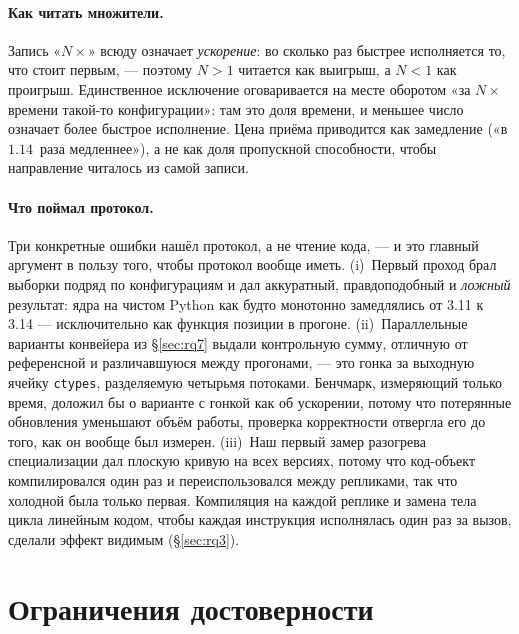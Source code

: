 \documentclass[10pt,a4paper]{article}
\newcommand{\meas}[2]{#2}
\newcommand{\code}[1]{\texttt{\small #1}}
\begin{document}
\paragraph{Как читать множители.} Запись «$N\times$» всюду означает \emph{ускорение}: во сколько раз
быстрее исполняется то, что стоит первым, --- поэтому $N>1$ читается как выигрыш, а $N<1$ как
проигрыш. Единственное исключение оговаривается на месте оборотом «за $N\times$ времени такой-то
конфигурации»: там это доля времени, и меньшее число означает более быстрое исполнение. Цена
приёма приводится как замедление («в $\meas{ratio:b4_threads-ft:single_thread_arith/ft|b4_threads-gil:single_thread_arith/gil}{1.14}$~раза медленнее»), а не как доля пропускной
способности, чтобы направление читалось из самой записи.

\paragraph{Что поймал протокол.}
Три конкретные ошибки нашёл протокол, а не чтение кода, --- и это главный аргумент в пользу того,
чтобы протокол вообще иметь. (i)~Первый проход брал выборки подряд по конфигурациям и дал
аккуратный, правдоподобный и \emph{ложный} результат: ядра на чистом Python как будто монотонно
замедлялись от 3.11 к 3.14 --- исключительно как функция позиции в прогоне. (ii)~Параллельные варианты конвейера из \S\ref{sec:rq7} выдали контрольную
сумму, отличную от референсной и различавшуюся между прогонами, --- это гонка за выходную ячейку
\code{ctypes}, разделяемую четырьмя потоками. Бенчмарк, измеряющий только время, доложил бы о
варианте с гонкой как об ускорении, потому что потерянные обновления уменьшают объём работы,
проверка корректности отвергла его до того, как он вообще был измерен. (iii)~Наш первый замер
разогрева специализации дал плоскую кривую на всех версиях, потому что код-объект компилировался
один раз и переиспользовался между репликами, так что холодной была только первая. Компиляция на
каждой реплике и замена тела цикла линейным кодом, чтобы каждая инструкция исполнялась один раз за
вызов, сделали эффект видимым (\S\ref{sec:rq3}).





\section{Ограничения достоверности}
\label{sec:threats}
\end{document}
